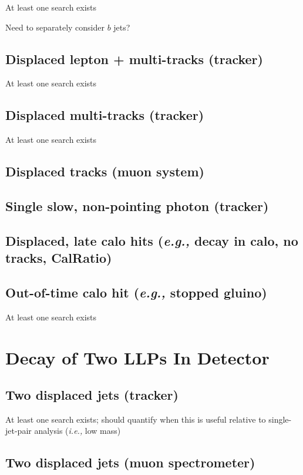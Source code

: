 At least one search exists

Need to separately consider $b$ jets?


\subsection{Displaced lepton + multi-tracks (tracker)}

At least one search exists

\subsection{Displaced multi-tracks (tracker)}

At least one search exists

\subsection{Displaced tracks (muon system)}

\subsection{Single slow, non-pointing photon (tracker)}

\subsection{Displaced, late calo hits (\emph{e.g.,} decay in calo, no tracks, CalRatio)}

\subsection{Out-of-time calo hit (\emph{e.g.,} stopped gluino)}

At least one search exists

\section{Decay of Two LLPs In Detector}

\subsection{Two displaced jets (tracker)}

At least one search exists; should quantify when this is useful relative to single-jet-pair analysis (\emph{i.e.,} low mass)

\subsection{Two displaced jets (muon spectrometer)}

